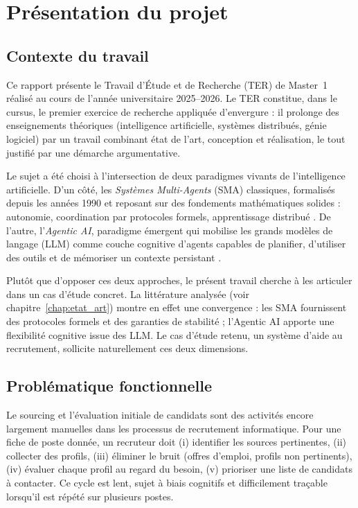 \chapter{Présentation du projet}
\label{chap:presentation}

\section{Contexte du travail}

Ce rapport présente le Travail d'Étude et de Recherche (TER) de Master~1 réalisé au cours de l'année universitaire 2025--2026. Le TER constitue, dans le cursus, le premier exercice de recherche appliquée d'envergure : il prolonge des enseignements théoriques (intelligence artificielle, systèmes distribués, génie logiciel) par un travail combinant état de l'art, conception et réalisation, le tout justifié par une démarche argumentative.

Le sujet a été choisi à l'intersection de deux paradigmes vivants de l'intelligence artificielle. D'un côté, les \emph{Systèmes Multi-Agents} (SMA) classiques, formalisés depuis les années 1990 et reposant sur des fondements mathématiques solides : autonomie, coordination par protocoles formels, apprentissage distribué \cite{dorri2018mas,sma_general_survey}. De l'autre, l'\emph{Agentic AI}, paradigme émergent qui mobilise les grands modèles de langage (LLM) comme couche cognitive d'agents capables de planifier, d'utiliser des outils et de mémoriser un contexte persistant \cite{sapkota2026,abouali2026}.

Plutôt que d'opposer ces deux approches, le présent travail cherche à les articuler dans un cas d'étude concret. La littérature analysée (voir chapitre~\ref{chap:etat_art}) montre en effet une convergence : les SMA fournissent des protocoles formels et des garanties de stabilité ; l'Agentic AI apporte une flexibilité cognitive issue des LLM. Le cas d'étude retenu, un système d'aide au recrutement, sollicite naturellement ces deux dimensions.

\section{Problématique fonctionnelle}

Le sourcing et l'évaluation initiale de candidats sont des activités encore largement manuelles dans les processus de recrutement informatique. Pour une fiche de poste donnée, un recruteur doit (i) identifier les sources pertinentes, (ii) collecter des profils, (iii) éliminer le bruit (offres d'emploi, profils non pertinents), (iv) évaluer chaque profil au regard du besoin, (v) prioriser une liste de candidats à contacter. Ce cycle est lent, sujet à biais cognitifs et difficilement traçable lorsqu'il est répété sur plusieurs postes.

